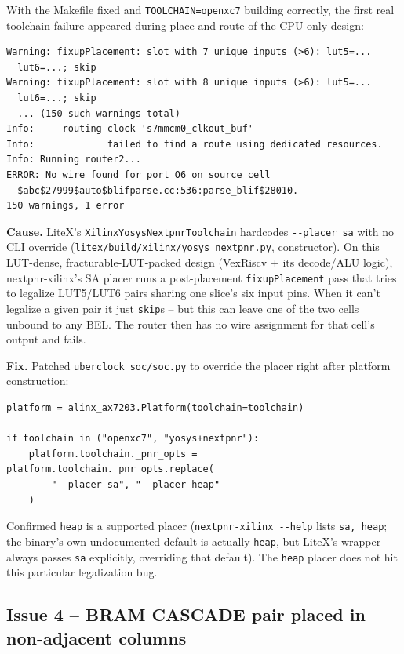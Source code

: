 \documentclass[11pt]{article}
\begin{document}
With the Makefile fixed and \lstinline{TOOLCHAIN=openxc7} building
correctly, the first real toolchain failure appeared during
place-and-route of the CPU-only design:

\begin{lstlisting}[style=termout]
Warning: fixupPlacement: slot with 7 unique inputs (>6): lut5=...
  lut6=...; skip
Warning: fixupPlacement: slot with 8 unique inputs (>6): lut5=...
  lut6=...; skip
  ... (150 such warnings total)
Info:     routing clock 's7mmcm0_clkout_buf'
Info:             failed to find a route using dedicated resources.
Info: Running router2...
ERROR: No wire found for port O6 on source cell
  $abc$27999$auto$blifparse.cc:536:parse_blif$28010.
150 warnings, 1 error
\end{lstlisting}

\textbf{Cause.} LiteX's \lstinline{XilinxYosysNextpnrToolchain} hardcodes
\lstinline{--placer sa} with no CLI override
(\lstinline{litex/build/xilinx/yosys_nextpnr.py}, constructor). On this
LUT-dense, fracturable-LUT-packed design (VexRiscv + its decode/ALU
logic), nextpnr-xilinx's SA placer runs a post-placement
\lstinline{fixupPlacement} pass that tries to legalize LUT5/LUT6 pairs
sharing one slice's six input pins. When it can't legalize a given pair
it just \lstinline{skip}s -- but this can leave one of the two cells
unbound to any BEL. The router then has no wire assignment for that
cell's output and fails.

\textbf{Fix.} Patched \lstinline{uberclock_soc/soc.py} to override the
placer right after platform construction:
\begin{lstlisting}[style=codeblk]
platform = alinx_ax7203.Platform(toolchain=toolchain)

if toolchain in ("openxc7", "yosys+nextpnr"):
    platform.toolchain._pnr_opts = platform.toolchain._pnr_opts.replace(
        "--placer sa", "--placer heap"
    )
\end{lstlisting}
Confirmed \lstinline{heap} is a supported placer
(\lstinline{nextpnr-xilinx --help} lists \lstinline{sa, heap}; the binary's
own undocumented default is actually \lstinline{heap}, but LiteX's wrapper
always passes \lstinline{sa} explicitly, overriding that default). The
\lstinline{heap} placer does not hit this particular legalization bug.

\subsection{Issue 4 -- BRAM CASCADE pair placed in non-adjacent columns}
\end{document}
